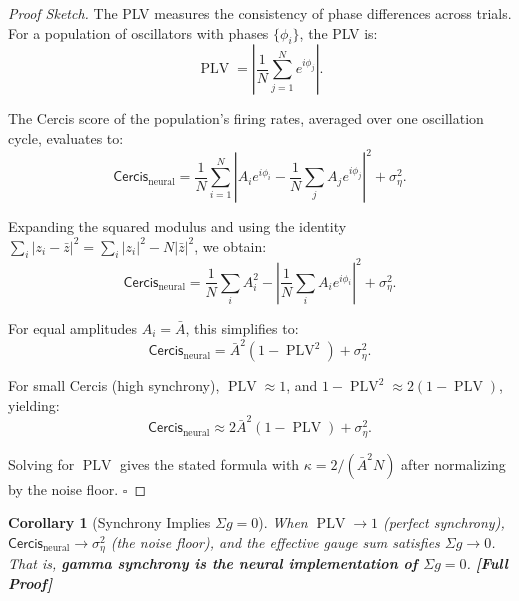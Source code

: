 \documentclass[12pt,a4paper]{article}
\newtheorem{corollary}[theorem]{Corollary}
\theoremstyle{remark}
\newcommand{\Cercis}{\textsf{Cercis}}
\DeclareMathOperator{\PLV}{PLV}
\newcommand{\rigorFull}{\textbf{[Full Proof]}}
\begin{document}
\begin{proof}[Proof Sketch]
The PLV measures the consistency of phase differences across trials. For a
population of oscillators with phases $\{\phi_i\}$, the PLV is:
\begin{equation}\label{eq:plv-proof-1}
    \PLV = \left| \frac{1}{N} \sum_{j=1}^{N} e^{i\phi_j} \right|.
\end{equation}

The \Cercis{} score of the population's firing rates, averaged over one
oscillation cycle, evaluates to:
\begin{equation}\label{eq:plv-proof-2}
    \Cercis_{\text{neural}} = \frac{1}{N} \sum_{i=1}^{N} \left| A_i e^{i\phi_i} - \frac{1}{N}\sum_{j} A_j e^{i\phi_j} \right|^2 + \sigma_\eta^2.
\end{equation}

Expanding the squared modulus and using the identity
$\sum_i |z_i - \bar{z}|^2 = \sum_i |z_i|^2 - N|\bar{z}|^2$, we obtain:
\begin{equation}\label{eq:plv-proof-3}
    \Cercis_{\text{neural}} = \frac{1}{N}\sum_i A_i^2 - \left|\frac{1}{N}\sum_i A_i e^{i\phi_i}\right|^2 + \sigma_\eta^2.
\end{equation}

For equal amplitudes $A_i = \bar{A}$, this simplifies to:
\begin{equation}\label{eq:plv-proof-4}
    \Cercis_{\text{neural}} = \bar{A}^2(1 - \PLV^2) + \sigma_\eta^2.
\end{equation}

For small \Cercis{} (high synchrony), $\PLV \approx 1$, and
$1 - \PLV^2 \approx 2(1 - \PLV)$, yielding:
\begin{equation}\label{eq:plv-proof-5}
    \Cercis_{\text{neural}} \approx 2\bar{A}^2(1 - \PLV) + \sigma_\eta^2.
\end{equation}

Solving for $\PLV$ gives the stated formula with $\kappa = 2/(\bar{A}^2 N)$
after normalizing by the noise floor. $\square$
\end{proof}

\begin{corollary}[Synchrony Implies $\Sigma g = 0$]\label{cor:sync-sigma}
When $\PLV \to 1$ (perfect synchrony), $\Cercis_{\text{neural}} \to \sigma_\eta^2$
(the noise floor), and the effective gauge sum satisfies $\Sigma g \to 0$.
That is, \textbf{gamma synchrony is the neural implementation of $\Sigma g = 0$}.
\rigorFull
\end{corollary}
\end{document}
